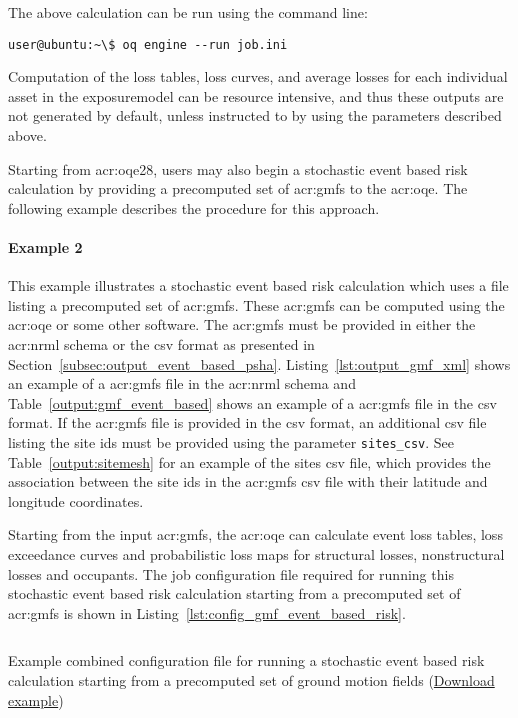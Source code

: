 The above calculation can be run using the command line:

\begin{verbatim}
user@ubuntu:~\$ oq engine --run job.ini
\end{verbatim}

Computation of the loss tables, loss curves, and average losses for each
individual \gls{asset} in the \gls{exposuremodel} can be resource intensive,
and thus these outputs are not generated by default, unless instructed to by
using the parameters described above.


Starting from \gls{acr:oqe28}, users may also begin a stochastic event based
risk calculation by providing a precomputed set of \glspl{acr:gmf} to the
\gls{acr:oqe}. The following example describes the procedure for this
approach.

\paragraph{Example 2}

This example illustrates a stochastic event based risk calculation which uses
a file listing a precomputed set of \glspl{acr:gmf}. These \glspl{acr:gmf} can
be computed using the \glsdesc{acr:oqe} or some other software. The
\glspl{acr:gmf} must be provided in either the \gls{acr:nrml} schema or the
csv format as presented in Section~\ref{subsec:output_event_based_psha}.
Listing~\ref{lst:output_gmf_xml} shows an example of a \glspl{acr:gmf} file in
the \gls{acr:nrml} schema and Table~\ref{output:gmf_event_based} shows an
example of a \glspl{acr:gmf} file in the csv format. If the \glspl{acr:gmf}
file is provided in the csv format, an additional csv file listing the site
ids must be provided using the parameter \Verb+sites_csv+. See
Table~\ref{output:sitemesh} for an example of the sites csv file, which
provides the association between the site ids in the \glspl{acr:gmf} csv file
with their latitude and longitude coordinates.

Starting from the input \glspl{acr:gmf}, the \gls{acr:oqe} can calculate event
loss tables, loss exceedance curves and probabilistic loss maps for structural
losses, nonstructural losses and occupants. The
job configuration file required for running this stochastic event based risk
calculation starting from a precomputed set of \glspl{acr:gmf} is shown in
Listing~\ref{lst:config_gmf_event_based_risk}.

\begin{listing}[htbp]
  \inputminted[firstline=1,firstnumber=1,fontsize=\scriptsize
  ,frame=single,bgcolor=lightgray,linenos,label=job.ini]{ini}{oqum/risk/verbatim/config_gmf_event_based_risk.ini}
  \caption{Example combined configuration file for running a stochastic event based risk calculation starting from a precomputed set of ground motion fields (\href{https://raw.githubusercontent.com/gem/oq-engine/master/doc/manual/oqum/risk/verbatim/config_gmf_event_based_risk.ini}{Download example})}
  \label{lst:config_gmf_event_based_risk}
\end{listing}
